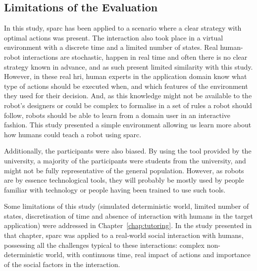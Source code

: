 \subsection{Limitations of the Evaluation}

In this study, \gls{sparc} has been applied to a scenario where a clear strategy with optimal actions was present. The interaction also took place in a virtual environment with a discrete time and a limited number of states. Real human-robot interactions are stochastic, happen in real time and often there is no clear strategy known in advance, and as such present limited similarity with this study. However, in these real \gls{hri}, human experts in the application domain know what type of actions should be executed when, and which features of the environment they used for their decision. And, as this knowledge might not be available to the robot's designers or could be complex to formalise in a set of rules a robot should follow, robots should be able to learn from a domain user in an interactive fashion. This study presented a simple environment allowing us learn more about how humans could teach a robot using \gls{sparc}.

Additionally, the participants were also biased. By using the tool provided by the university, a majority of the participants were students from the university, and might not be fully representative of the general population. However, as robots are by essence technological tools, they will probably be mostly used by people familiar with technology or people having been trained to use such tools. 

Some limitations of this study (simulated deterministic world, limited number of states, discretisation of time and absence of interaction with humans in the target application) were addressed in Chapter~\ref{chap:tutoring}. In the study presented in that chapter, \gls{sparc} was applied to a real-world social interaction with humans, possessing all the challenges typical to these interactions: complex non-deterministic world, with continuous time, real impact of actions and importance of the social factors in the interaction.

